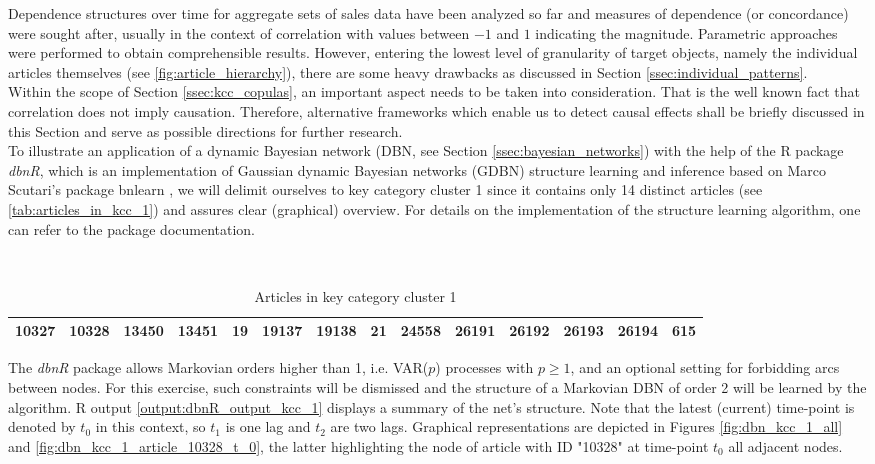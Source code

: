 
Dependence structures over time for aggregate sets of sales data have been analyzed so far and measures of dependence (or concordance) were sought after, usually in the context of correlation with values between $-1$ and $1$ indicating the magnitude. Parametric approaches were performed to obtain comprehensible results. However, entering the lowest level of granularity of target objects, namely the individual articles themselves (see \autoref{fig:article_hierarchy}), there are some heavy drawbacks as discussed in Section \ref{ssec:individual_patterns}.
\\

Within the scope of Section \ref{ssec:kcc_copulas}, an important aspect needs to be taken into consideration. That is the well known fact that correlation does not imply causation. Therefore, alternative frameworks which enable us to detect causal effects shall be briefly discussed in this Section and serve as possible directions for further research.
\\

To illustrate an application of a dynamic Bayesian network (\ac{DBN}, see Section \ref{ssec:bayesian_networks}) with the help of the R package \textit{dbnR}, which is an implementation of Gaussian dynamic Bayesian networks (GDBN) structure learning and inference based on Marco Scutari’s package bnlearn \citep{bnlearn_package}, we will delimit ourselves to key category cluster 1 since it contains only 14 distinct articles (see \autoref{tab:articles_in_kcc_1}) and assures clear (graphical) overview. For details on the implementation of the structure learning algorithm, one can refer to the package documentation.
\\

\begin{table}[H]
\setlength\arrayrulewidth{1pt}  
\centering
\begin{adjustbox}{max width=\textwidth}\
\begin{tabular}{|c|c|c|c|c|c|c|c|c|c|c|c|c|c|}
\hline
10327 & 10328 & 13450 & 13451 & 19 & 19137 & 19138 & 21 & 24558 & 26191 & 26192 & 26193 & 26194 & 615 \\ \hline
\end{tabular}
\end{adjustbox}
\caption{Articles in key category cluster 1}
\label{tab:articles_in_kcc_1}
\end{table}


The \textit{dbnR} package allows Markovian orders higher than 1, i.e. \ac{VAR}($p$) processes with $p \geq 1$, and an optional setting for forbidding arcs between nodes. For this exercise, such constraints will be dismissed and the structure of a Markovian \ac{DBN} of order 2 will be learned by the algorithm. R output \ref{output:dbnR_output_kcc_1} displays a summary of the net's structure. Note that the latest (current) time-point is denoted by $t_0$ in this context, so $t_1$ is one lag and $t_2$ are two lags. Graphical representations are depicted in Figures \ref{fig:dbn_kcc_1_all} and \ref{fig:dbn_kcc_1_article_10328_t_0}, the latter highlighting the node of article with ID "10328" at time-point $t_0$ all adjacent nodes.
\\


